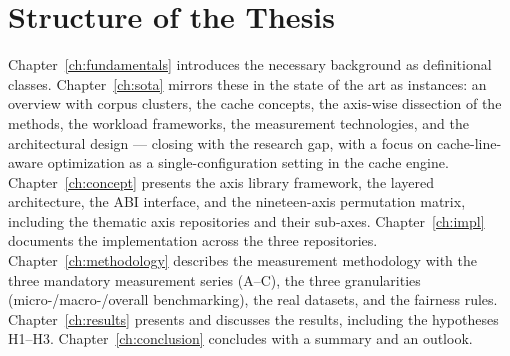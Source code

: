 \section{Structure of the Thesis}\label{sec:structure}

Chapter~\ref{ch:fundamentals} introduces the necessary background as definitional classes.
Chapter~\ref{ch:sota} mirrors these in the state of the art as instances: an overview with corpus
clusters, the cache concepts, the axis-wise dissection of the methods, the workload frameworks, the
measurement technologies, and the architectural design --- closing with the research gap, with a
focus on cache-line-aware optimization as a single-configuration setting in the cache engine.
Chapter~\ref{ch:concept} presents the axis library framework, the layered architecture, the ABI
interface, and the nineteen-axis permutation matrix, including the thematic axis repositories and
their sub-axes. Chapter~\ref{ch:impl} documents the implementation across the three repositories.
Chapter~\ref{ch:methodology} describes the measurement methodology with the three mandatory
measurement series (A--C), the three granularities (micro-/macro-/overall benchmarking), the real
datasets, and the fairness rules. Chapter~\ref{ch:results} presents and discusses the results,
including the hypotheses H1--H3. Chapter~\ref{ch:conclusion} concludes with a summary and an
outlook.

